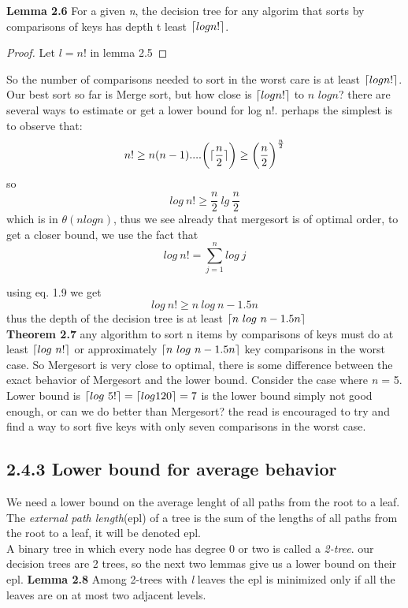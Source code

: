 \documentclass[a4paper,10pt,titlepage]{report}
\DeclarePairedDelimiter{\ceil}{\lceil}{\rceil}
\begin{document}
\vspace{5mm}
\textbf{Lemma 2.6} For a given \textit{n}, the decision tree for any algorim that sorts by comparisons of keys has depth t least $\ceil{log n!}$.
\vspace{5mm}
\begin{proof}
Let $\textit{l} = \textit{n}!$ in lemma 2.5
\end{proof}
\vspace{5mm}
So the number of comparisons needed to sort in the worst care is at least $\ceil{log n!}$. Our best sort so far is Merge sort, but how close is $\ceil{log n!}$ to $\textit{n }log\textit{n}$? there are several ways to estimate or get a lower bound for log n!. perhaps the simplest is to observe that:
\begin{equation}
n! \geq n(n-1)....\bigg(\ceil{\frac{n}{2}}\bigg) \geq \bigg(\frac{n}{2}\bigg)^{\frac{n}{2}}
\end{equation}
so
\begin{equation}
log \ n! \geq \frac{n}{2} \ lg \ \frac{n}{2}
\end{equation}
which is in $\theta(n log n)$, thus we see already that mergesort is of optimal order, to get a closer bound, we use the fact that 
\begin{equation}
log \ n! = \sum_{j=1}^n log \ j
\end{equation}

using eq. 1.9 we get
\begin{equation}
log \ n! \geq n \ log \ n - 1.5n
\end{equation}
thus the depth of the decision tree is at least $\ceil{n \ log \ n - 1.5n}$\\

\vspace{5mm}
\textbf{Theorem 2.7} any algorithm to sort n items by comparisons of keys must do at least $ \ceil{log \ n!}$ or approximately  $\ceil{n \ log \ n - 1.5n}$ key comparisons in the worst case.
\vspace{5mm}
So Mergesort is very close to optimal, there is some difference between the exact behavior of Mergesort and the lower bound. Consider the case where \textit{n} = 5. Lower bound is $\ceil{log \ 5!} = \ceil{log 120} = 7$ is the lower bound simply not good enough, or can we do better than Mergesort? the read is encouraged to try and find a way to sort five keys with only seven comparisons in the worst case.
\subsection{2.4.3 Lower bound for average behavior}
We need a lower bound on the average lenght of all paths from the root to a leaf. The \textit{external path length}(epl) of a tree is the sum of the lengths of all paths from the root to a leaf, it will be denoted epl. \\
A binary tree in which every node has degree 0 or two is called a \textit{2-tree}. our decision trees are 2 trees, so the next two lemmas give us a lower bound on their epl.
\vspace{5mm}
\textbf{Lemma 2.8} Among 2-trees with \textit{l} leaves the epl is minimized only if all the leaves are on at most two adjacent levels.
\end{document}
